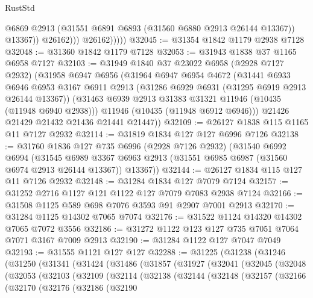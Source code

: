 \begin{lexlean}{RustStd}
\begin{coremodule}
                        @6869
                        @2913
                        (@31551 @6891 @6893 (@31560 @6880 @2913 @26144 @13367))
                        @13367))
                    @26162)))
              @26162)))))
@32045 := @31354 @1842 @1179 @2938 @7128
@32048 := @31360 @1842 @1179 @7128
@32053 := @31943 @1838 @37 @1165 @6958 @7127
@32103 := @31949
    @1840
    @37
    @23022
    @6958
    (@2928 @7127 @2932)
    (@31958
      @6947
      @6956
      (@31964
        @6947
        @6954
        @4672
        (@31441
          @6933
          @6946
          @6953
          @3167
          @6911
          @2913
          (@31286 @6929 @6931 (@31295 @6919 @2913 @26144 @13367))
          (@31463 @6939 @2913 @31383 @31321 @11946 (@10435 (@11948 @6940 @2938)))
          @11946
          (@10435 (@11948 @6912 @6946)))
        @21426
        @21429
        @21432
        @21436
        @21441
        @21447))
@32109 := @26127 @1838 @115 @1165 @11 @7127 @2932
@32114 := @31819 @1834 @127 @127 @6996 @7126
@32138 := @31760
    @1836
    @127
    @735
    @6996
    (@2928 @7126 @2932)
    (@31540
      @6992
      @6994
      (@31545
        @6989
        @3367
        @6963
        @2913
        (@31551 @6985 @6987 (@31560 @6974 @2913 @26144 @13367))
        @13367))
@32144 := @26127 @1834 @115 @127 @11 @7126 @2932
@32148 := @31284 @1834 @127 @7079 @7124
@32157 := @31252 @2716 @1127 @121 @1122 @127 @7079 @7083 @2938 @7124
@32166 := @31508 @1125 @589 @698 @7076 @3593 @91 @2907 @7001 @2913
@32170 := @31284 @1125 @14302 @7065 @7074
@32176 := @31522 @1124 @14320 @14302 @7065 @7072 @3556
@32186 := @31272 @1122 @123 @127 @735 @7051 @7064 @7071 @3167 @7009 @2913
@32190 := @31284 @1122 @127 @7047 @7049
@32193 := @31555 @1121 @127 @127
@32288 := @31225
    (@31238
      (@31246
        (@31250
          (@31341
            (@31424
              (@31486
                (@31857
                  (@31927
                    (@32041
                      (@32045
                        (@32048
                          (@32053
                            (@32103
                              (@32109
                                (@32114
                                  (@32138
                                    (@32144
                                      (@32148
                                        (@32157
                                          (@32166
                                            (@32170
                                              (@32176
                                                (@32186
                                                  (@32190

\end{coremodule}
\end{lexlean}
